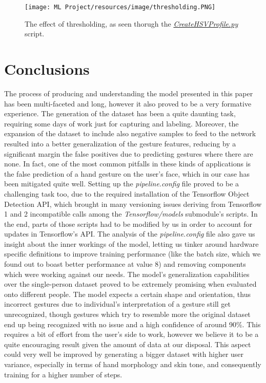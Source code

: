 \documentclass[a4paper, 12pt]{article}
\begin{document}
\begin{flushleft}
\begin{figure}[!h]
    \centering
    \texttt{[image: ML Project/resources/image/thresholding.PNG]} \caption{The effect of thresholding, as seen thorugh the \textit{\href{https://github.com/MarzioVallero/ML-Based-Blender-Gestural-Input-Interface/blob/master/CreateHSVProfile.py}{CreateHSVProfile.py}} script.}
\end{figure}
\label{figure6}

\end{flushleft}

\section{Conclusions}
\begin{flushleft}
The process of producing and understanding the model presented in this paper has been multi-faceted and long, however it also proved to be a very formative experience.\linebreak
The generation of the dataset has been a quite daunting task, requiring some days of work just for capturing and labeling. Moreover, the expansion of the dataset to include also negative samples to feed to the network resulted into a better generalization of the gesture features, reducing by a significant margin the false positives due to predicting gestures where there are none. In fact, one of the most common pitfalls in these kinds of applications is the false prediction of a hand gesture on the user's face, which in our case has been mitigated quite well.\linebreak
Setting up the \textit{pipeline.config} file proved to be a challenging task too, due to the required installation of the Tensorflow Object Detection API, which brought in many versioning issues deriving from Tensorflow 1 and 2 incompatible calls among the \textit{Tensorflow/models} submodule's scripts. In the end, parts of those scripts had to be modified by us in order to account for updates in Tensorflow's API.\linebreak
The analysis of the \textit{pipeline.config} file also gave us insight about the inner workings of the model, letting us tinker around hardware specific definitions to improve training performance (like the batch size, which we found out to boast better performance at value 8) and removing components which were working against our needs.\linebreak
The model's generalization capabilities over the single-person dataset proved to be extremely promising when evaluated onto different people. The model expects a certain shape and orientation, thus incorrect gestures due to individual's interpretation of a gesture still get unrecognized, though gestures which try to resemble more the original dataset end up being recognized with no issue and a high confidence of around 90\%. This requires a bit of effort from the user's side to work, however we believe it to be a quite encouraging result given the amount of data at our disposal. This aspect could very well be improved by generating a bigger dataset with higher user variance, especially in terms of hand morphology and skin tone, and consequently training for a higher number of steps.\linebreak

\end{flushleft}
\end{document}
